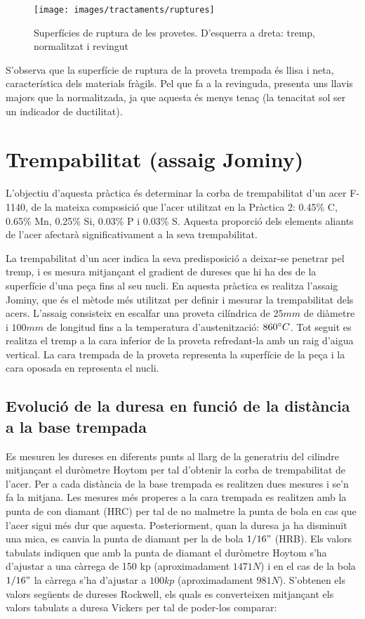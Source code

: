 \documentclass[a4paper]{report}
\begin{document}
\begin{figure}[H]
	\centering
	\texttt{[image: images/tractaments/ruptures]}
	\caption{Superfícies de ruptura de les provetes. D'esquerra a dreta: tremp, normalitzat i revingut}
	\label{fig:tract-ruptures}
\end{figure}

S’observa que la superfície de ruptura de la proveta trempada és llisa i neta, característica dels materials fràgils. Pel que fa a la revinguda, presenta uns llavis majors que la normalitzada, ja que aquesta és menys tenaç (la tenacitat sol ser un indicador de ductilitat).

\chapter{Trempabilitat (assaig Jominy)}
L’objectiu d’aquesta pràctica és determinar la corba de trempabilitat d’un acer F-1140, de la mateixa composició que l’acer utilitzat en la Pràctica 2: 0.45\% C, 0.65\% Mn, 0.25\% Si, 0.03\% P i 0.03\% S. Aquesta proporció dels elements aliants de l’acer afectarà significativament a la seva trempabilitat.

La trempabilitat d’un acer indica la seva predisposició a deixar-se penetrar pel tremp, i es mesura mitjançant el gradient de dureses que hi ha des de la superfície d’una peça fins al seu nucli. En aquesta pràctica es realitza l’assaig Jominy, que és el mètode més utilitzat per definir i mesurar la trempabilitat dels acers. L’assaig consisteix en escalfar una proveta cilíndrica de $25 mm$ de diàmetre i $100 mm$ de longitud fins a la temperatura d’austenització: $860 \degree C$. Tot seguit es realitza el tremp a la cara inferior de la proveta refredant-la amb un raig d’aigua vertical. La cara trempada de la proveta representa la superfície de la peça i la cara oposada en representa el nucli. 

\section{Evolució de la duresa en funció de la distància a la base trempada}
Es mesuren les dureses en diferents punts al llarg de la generatriu del cilindre mitjançant el duròmetre Hoytom per tal d’obtenir la corba de trempabilitat de l’acer. Per a cada distància de la base trempada es realitzen dues mesures i se'n fa la mitjana. Les mesures més properes a la cara trempada es realitzen amb la punta de con diamant (HRC) per tal de no malmetre la punta de bola en cas que l’acer sigui més dur que aquesta. Posteriorment, quan la duresa ja ha disminuït una mica, es canvia la punta de diamant per la de bola $1/16"$ (HRB). Els valors tabulats indiquen que amb la punta de diamant el duròmetre Hoytom s’ha d’ajustar a una càrrega de 150 kp (aproximadament $1471 N$) i en el cas de la bola $1/16"$ la càrrega s’ha d’ajustar a $100 kp$ (aproximadament $981 N$). S’obtenen els valors següents de dureses Rockwell, els quals es converteixen mitjançant els valors tabulats a duresa Vickers per tal de poder-los comparar:
\end{document}
